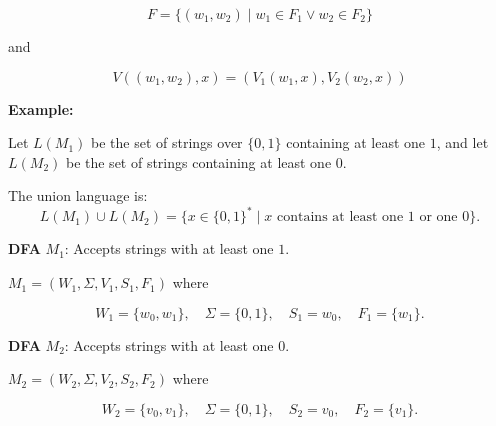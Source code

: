 \documentclass[12pt,a4paper,openany]{article}
\begin{document}
\[F = \{(w_1, w_2) \mid w_1 \in F_1 \lor w_2 \in F_2\}\]

and

\[V((w_1, w_2), x) = (V_1(w_1, x), V_2(w_2, x))\]

\textbf{Example:}

Let $L(M_1)$ be the set of strings over $\{0,1\}$ containing at least one $1$,  
and let $L(M_2)$ be the set of strings containing at least one $0$.

The union language is:
\[
L(M_1) \cup L(M_2) = \{ x \in \{0,1\}^* \mid x \text{ contains at least one } 1 \text{ or one } 0 \}.
\]

\textbf{DFA} $M_1$: Accepts strings with at least one $1$.

$M_1 = (W_1,\Sigma,V_1,S_1,F_1)$ where

\[
W_1 = \{w_0,w_1\}, \quad
\Sigma = \{0,1\}, \quad
S_1 = w_0, \quad
F_1 = \{w_1\}.
\]

\begin{center}
\end{center}

\textbf{DFA} $M_2$: Accepts strings with at least one $0$.

$M_2 = (W_2,\Sigma,V_2,S_2,F_2)$ where

\[
W_2 = \{v_0,v_1\}, \quad
\Sigma = \{0,1\}, \quad
S_2 = v_0, \quad
F_2 = \{v_1\}.
\]

\begin{center}
\end{center}
\end{document}
